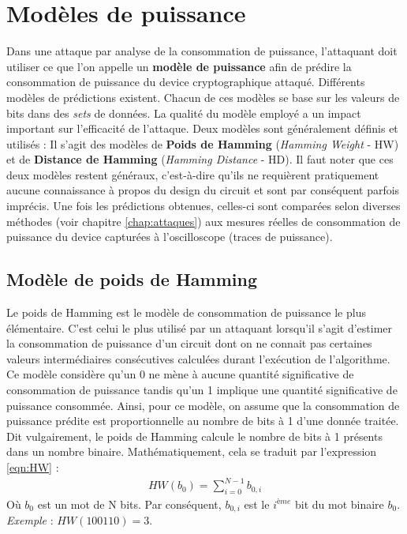 \documentclass[oneside]{book}
\begin{document}
\section{Modèles de puissance}
\label{sec:modelpuissance}
Dans une attaque par analyse de la consommation de puissance, l'attaquant doit utiliser ce que l'on appelle un \textbf{modèle de puissance} \cite{mangard_power_2007} afin de prédire la consommation de puissance du device cryptographique attaqué. Différents modèles de prédictions existent. Chacun de ces modèles se base sur les valeurs de bits dans des \textit{sets} de données. La qualité du modèle employé a un impact important sur l'efficacité de l'attaque. Deux modèles sont généralement définis et utilisés : Il s'agit des modèles de \textbf{Poids de Hamming} (\textit{Hamming Weight} - HW) et de \textbf{Distance de Hamming} (\textit{Hamming Distance} - HD). Il faut noter que ces deux modèles restent généraux, c'est-à-dire qu'ils ne requièrent pratiquement aucune connaissance à propos du design du circuit et sont par conséquent parfois imprécis. Une fois les prédictions obtenues, celles-ci sont comparées selon diverses méthodes (voir chapitre \ref{chap:attaques}) aux mesures réelles de consommation de puissance du device capturées à l'oscilloscope (traces de puissance). 

\subsection{Modèle de poids de Hamming}
\label{sec:modelHW}

Le poids de Hamming est le modèle de consommation de puissance le plus élémentaire. C'est celui le plus utilisé par un attaquant lorsqu'il s'agit d'estimer la consommation de puissance d'un circuit dont on ne connait pas certaines valeurs intermédiaires consécutives calculées durant l'exécution de l'algorithme. Ce modèle considère qu'un 0 ne mène à aucune quantité significative de consommation de puissance tandis qu'un 1 implique une quantité significative de puissance consommée. Ainsi, pour ce modèle, on assume que la consommation de puissance prédite est proportionnelle au nombre de bits à 1 d'une donnée traitée. Dit vulgairement, le poids de Hamming calcule le nombre de bits à 1 présents dans un nombre binaire. Mathématiquement, cela se traduit par l'expression \ref{eqn:HW} : \\
\begin{gather}
	HW(b_{0}) = \sum_{i=0}^{N-1} b_{0,i}\label{eqn:HW}
\end{gather}
Où $b_{0}$ est un mot de N bits. Par conséquent, $b_{0,i}$ est le $i^{ème}$ bit du mot binaire $b_{0}$. \\
\textit{Exemple} : $HW(100110) = 3.$
\end{document}
